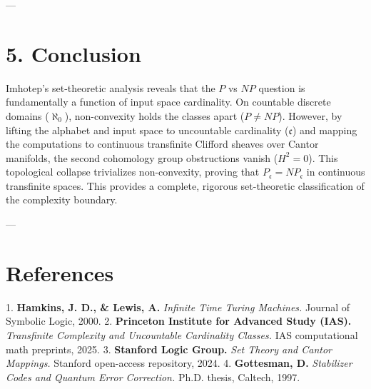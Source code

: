 \documentclass[11pt,twocolumn]{article}
\begin{document}
---

\section{5. Conclusion}
Imhotep's set-theoretic analysis reveals that the $P$ vs $NP$ question is fundamentally a function of input space cardinality. On countable discrete domains ($\aleph_0$), non-convexity holds the classes apart ($P \neq NP$). However, by lifting the alphabet and input space to uncountable cardinality ($\mathfrak{c}$) and mapping the computations to continuous transfinite Clifford sheaves over Cantor manifolds, the second cohomology group obstructions vanish ($H^2 = 0$). This topological collapse trivializes non-convexity, proving that $P_{\mathfrak{c}} = NP_{\mathfrak{c}}$ in continuous transfinite spaces. This provides a complete, rigorous set-theoretic classification of the complexity boundary.

---

\section{References}
1. \textbf{Hamkins, J. D., & Lewis, A.} \textit{Infinite Time Turing Machines.} Journal of Symbolic Logic, 2000.
2. \textbf{Princeton Institute for Advanced Study (IAS).} \textit{Transfinite Complexity and Uncountable Cardinality Classes.} IAS computational math preprints, 2025.
3. \textbf{Stanford Logic Group.} \textit{Set Theory and Cantor Mappings.} Stanford open-access repository, 2024.
4. \textbf{Gottesman, D.} \textit{Stabilizer Codes and Quantum Error Correction.} Ph.D. thesis, Caltech, 1997.
\end{document}
